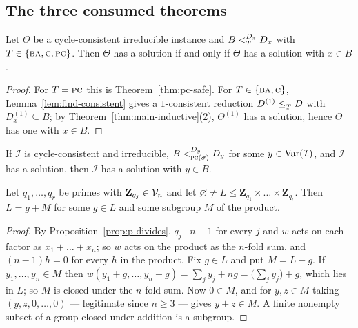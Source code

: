\subsection{The three consumed theorems}\label{sec:codim-one}

\begin{theorem}\label{thm:reductions-safe}
Let $\Theta$ be a cycle-consistent irreducible instance and
$B\subt[D_{x}]{T}D_{x}$ with $T\in\{\TBA,\TC,\TPC\}$. Then $\Theta$ has a
solution if and only if $\Theta$ has a solution with $x\in B$.
\end{theorem}

\begin{proof}
For $T=\TPC$ this is Theorem~\ref{thm:pc-safe}. For $T\in\{\TBA,\TC\}$,
Lemma~\ref{lem:find-consistent} gives a $1$-consistent reduction
$D^{(1)}\subte{T}D$ with $D^{(1)}_{x}\subseteq B$; by
Theorem~\ref{thm:main-inductive}(2), $\Theta^{(1)}$ has a solution, hence
$\Theta$ has one with $x\in B$.
\end{proof}

\begin{theorem}\label{thm:pc-safe}
If $\mathcal I$ is cycle-consistent and irreducible, $B\subt[D_{y}]{\TPC(\sigma)}D_{y}$
for some $y\in\Var(\mathcal I)$, and $\mathcal I$ has a solution, then
$\mathcal I$ has a solution with $y\in B$.
\end{theorem}

\begin{lemma}\label{lem:subuniverse-coset}
Let $q_{1},\dots,q_{r}$ be primes with $\mathbf Z_{q_{j}}\in\Vn$ and let
$\varnothing\neq L\le\mathbf Z_{q_{1}}\times\dots\times\mathbf Z_{q_{r}}$. Then
$L=g+M$ for some $g\in L$ and some subgroup $M$ of the product.
\end{lemma}

\begin{proof}
By Proposition~\ref{prop:p-divides}, $q_{j}\mid n-1$ for every $j$ and $w$ acts
on each factor as $x_{1}+\dots+x_{n}$; so $w$ acts on the product as the
$n$-fold sum, and $(n-1)h=0$ for every $h$ in the product. Fix $g\in L$ and put
$M=L-g$. If $\bar y_{1},\dots,\bar y_{n}\in M$ then
$w(\bar y_{1}+g,\dots,\bar y_{n}+g)=\sum_{j}\bar y_{j}+ng=
\bigl(\sum_{j}\bar y_{j}\bigr)+g$, which lies in $L$; so $M$ is closed under
the $n$-fold sum. Now $0\in M$, and for $y,z\in M$ taking
$(y,z,0,\dots,0)$ --- legitimate since $n\ge3$ --- gives $y+z\in M$. A finite
nonempty subset of a group closed under addition is a subgroup.
\end{proof}

